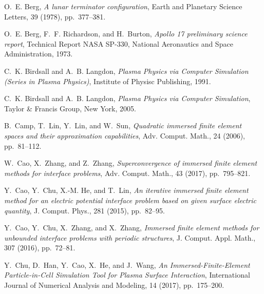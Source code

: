 \documentclass{siamart171218}
\begin{document}
\begin{thebibliography}{99}
{\sc O.~E. Berg}, {\em A lunar terminator configuration}, Earth and Planetary
  Science Letters, 39 (1978), pp.~377--381.

{\sc O.~E. Berg, F.~F. Richardson, and H.~Burton}, {\em Apollo 17 preliminary
  science report}, Technical Report NASA SP-330, National Aeronautics and Space
  Administration, 1973.

{\sc C.~K. Birdsall and A.~B. Langdon}, {\em Plasma Physics via Computer
  Simulation (Series in Plasma Physics)}, Institute of Physisc Publishing,
  1991.

{\sc C.~K. Birdsall and A.~B. Langdon}, {\em Plasma Physics via Computer
  Simulation}, Taylor \& Francis Group, New York, 2005.

{\sc B.~Camp, T.~Lin, Y.~Lin, and W.~Sun}, {\em Quadratic immersed finite
  element spaces and their approximation capabilities}, Adv. Comput. Math., 24
  (2006), pp.~81--112.

{\sc W.~Cao, X.~Zhang, and Z.~Zhang}, {\em Superconvergence of immersed finite
  element methods for interface problems}, Adv. Comput. Math., 43 (2017),
  pp.~795--821.

{\sc Y.~Cao, Y.~Chu, X.-M. He, and T.~Lin}, {\em An iterative immersed finite
  element method for an electric potential interface problem based on given
  surface electric quantity}, J. Comput. Phys., 281 (2015), pp.~82--95.

{\sc Y.~Cao, Y.~Chu, X.~Zhang, and X.~Zhang}, {\em Immersed finite element
  methods for unbounded interface problems with periodic structures}, J.
  Comput. Appl. Math., 307 (2016), pp.~72--81.

{\sc Y.~Chu, D.~Han, Y.~Cao, X.~He, and J.~Wang}, {\em \mbox{An}
  \mbox{I}mmersed-\mbox{F}inite-\mbox{E}lement \mbox{P}article-in-\mbox{C}ell
  \mbox{S}imulation \mbox{T}ool for \mbox{P}lasma \mbox{S}urface
  \mbox{I}nteraction}, International Journal of Numerical Analysis and
  Modeling, 14 (2017), pp.~175--200.


\end{thebibliography}
\end{document}
